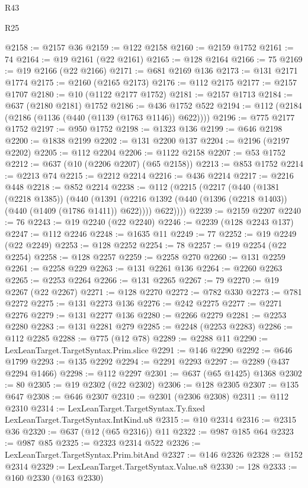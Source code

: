 \begin{lexlean}{R43}
\begin{lexlean}{R25}
\begin{coremodule}
{{{{{{{{{{{{{{{{{{{{{{{{{{{{{{{{{{{{{{{{{{{{{{{{{{{{{{{{{{{{{{{{{{{{{{{{{{{{{{{{{{{{{{{{{{{{{{{{{{{{{{{{{{{{{{{{{{{{{{{{{{{{{{{{{{{{{{{{{{{{{{{{{{{{{{{{{{{{{{{{{{{{{{{{{{{{{{{{{{{{{{{{{{{{{{{{{@2158 := @2157 @36
@2159 := @122 @2158
@2160 := @2159 @1752
@2161 := 74
@2164 := @19 @2161 (@22 @2161)
@2165 := @128 @2164
@2166 := 75
@2169 := @19 @2166 (@22 @2166)
@2171 := @681 @2169 @136
@2173 := @131 @2171 @1774
@2175 := @2160 (@2165 @2173)
@2176 := @112 @2175
@2177 := @2157 @1707
@2180 := @10 (@1122 @2177 @1752)
@2181 := @2157 @1713
@2184 := @637 (@2180 @2181) @1752
@2186 := @436 @1752 @522
@2194 := @112 (@2184 (@2186 (@1136 (@440 (@1139 (@1763 @1146)) @622))))
@2196 := @775 @2177 @1752
@2197 := @950 @1752
@2198 := @1323 @136
@2199 := @646 @2198
@2200 := @1838 @2199
@2202 := @131 @2200 @137
@2204 := @2196 (@2197 @2202)
@2205 := @112 @2204
@2206 := @1122 @2158
@2207 := @53 @1752
@2212 := @637 (@10 (@2206 @2207) (@65 @2158))
@2213 := @853 @1752
@2214 := @2213 @74
@2215 := @2212 @2214
@2216 := @436 @2214
@2217 := @2216 @448
@2218 := @852 @2214
@2238 := @112
    (@2215
      (@2217
        (@440
          (@1381 (@2218 @1385))
          (@440
            (@1391 (@2216 @1392 (@440 (@1396 (@2218 @1403)) (@440 (@1409 (@1786 @1411)) @622))))
            @622))))
@2239 := @2159 @2207
@2240 := 76
@2243 := @19 @2240 (@22 @2240)
@2246 := @2239 (@128 @2243 @137)
@2247 := @112 @2246
@2248 := @1635 @11
@2249 := 77
@2252 := @19 @2249 (@22 @2249)
@2253 := @128 @2252
@2254 := 78
@2257 := @19 @2254 (@22 @2254)
@2258 := @128 @2257
@2259 := @2258 @270
@2260 := @131 @2259
@2261 := @2258 @229
@2263 := @131 @2261 @136
@2264 := @2260 @2263
@2265 := @2253 @2264
@2266 := @131 @2265
@2267 := 79
@2270 := @19 @2267 (@22 @2267)
@2271 := @128 @2270
@2272 := @782 @330
@2273 := @781 @2272
@2275 := @131 @2273 @136
@2276 := @242 @2275
@2277 := @2271 @2276
@2279 := @131 @2277 @136
@2280 := @2266 @2279
@2281 := @2253 @2280
@2283 := @131 @2281 @279
@2285 := @2248 (@2253 @2283)
@2286 := @112 @2285
@2288 := @775 (@12 @78)
@2289 := @2288 @11
@2290 := LexLeanTarget.TargetSyntax.Prim.slice
@2291 := @146 @2290
@2292 := @646 @1799
@2293 := @135 @2292
@2294 := @2291 @2293
@2297 := @2289 (@437 @2294 @1466)
@2298 := @112 @2297
@2301 := @637 (@65 @1425) @1368
@2302 := 80
@2305 := @19 @2302 (@22 @2302)
@2306 := @128 @2305
@2307 := @135 @647
@2308 := @646 @2307
@2310 := @2301 (@2306 @2308)
@2311 := @112 @2310
@2314 := LexLeanTarget.TargetSyntax.Ty.fixed LexLeanTarget.TargetSyntax.IntKind.u8
@2315 := @10 @2314
@2316 := @2315 @36
@2320 := @637 (@12 (@65 @2316)) @11
@2322 := @987 @185 @64
@2323 := @987 @85
@2325 := @2323 @2314 @522
@2326 := LexLeanTarget.TargetSyntax.Prim.bitAnd
@2327 := @146 @2326
@2328 := @152 @2314
@2329 := LexLeanTarget.TargetSyntax.Value.u8
@2330 := 128
@2333 := @160 @2330 (@163 @2330)
}}}}}}}}}}}}}}}}}}}}}}}}}}}}}}}}}}}}}}}}}}}}}}}}}}}}}}}}}}}}}}}}}}}}}}}}}}}}}}}}}}}}}}}}}}}}}}}}}}}}}}}}}}}}}}}}}}}}}}}}}}}}}}}}}}}}}}}}}}}}}}}}}}}}}}}}}}}}}}}}}}}}}}}}}}}}}}}}}}}}}}}}}}}}}}}}}
\end{coremodule}
\end{lexlean}
\end{lexlean}
